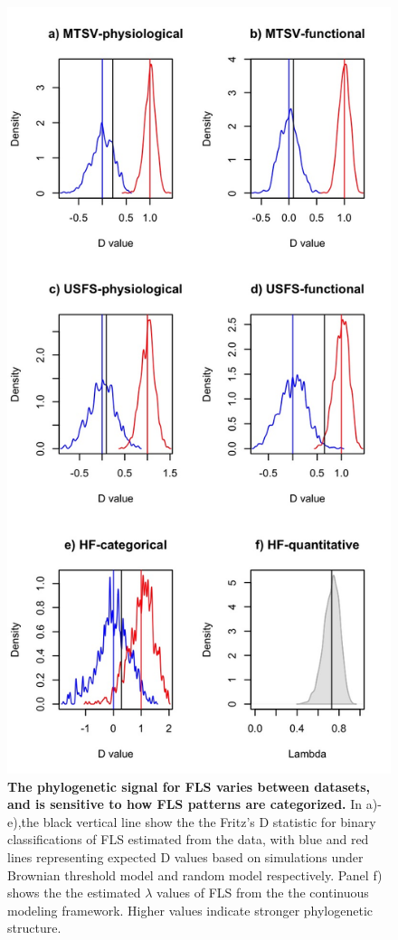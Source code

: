 \documentclass{article}\usepackage[]{graphicx}\usepackage[]{color}
\begin{document}
{\begin{figure}
 \includegraphics[height=0.9\textheight]{..//phylosig.jpeg} 
  \caption{\textbf{The phylogenetic signal for FLS varies between datasets, and is sensitive to how FLS patterns are categorized.} In a)-e),the black vertical line show the the Fritz's D statistic for binary classifications of FLS estimated from the data, with blue and red lines representing expected D values based on simulations under Brownian threshold model and random model respectively. Panel f) shows the the estimated $\lambda$ values of FLS from the the continuous modeling framework. Higher values indicate stronger phylogenetic structure.}
    \label{fig:Dstat}
    \end{figure}

}
\end{document}
